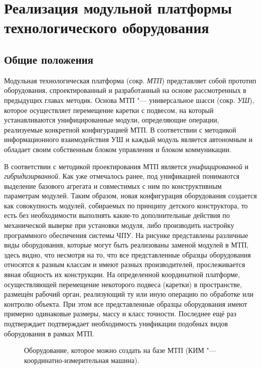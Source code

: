 \chapter{Реализация модульной платформы технологического оборудования}\label{ch:ch4}

\section{Общие положения}

Модульная технологическая платформа (сокр. \textit{МТП}) представляет собой прототип оборудования, спроектированный и разработанный на основе рассмотренных в предыдущих главах методик. Основа МТП "--- универсальное шасси (сокр. \textit{УШ}), которое осуществляет перемещение каретки с подвесом, на который устанавливаются унифицированные модули, определяющие операции, реализуемые конкретной конфигурацией МТП. В соответствии с  методикой информационного взаимодействия УШ и каждый модуль является автономным и обладает своим собственным блоком управления и блоком коммуникации.

В соответствии с методикой проектирования МТП является \textit{унифицированной} и \textit{гибридизирванной}. Как уже отмечалось ранее, под унификацией понимаются выделение базового агрегата и совместимых с ним по конструктивным параметрам модулей. Таким образом, новая конфигурация оборудования создается как совокупность модулей, собираемых по принципу детского конструктора, то есть без необходимости выполнять какие-то дополнительные действия по механической выверке при установки модуля, либо производить настройку программного обеспечения системы ЧПУ. На рисунке представлены различные виды оборудования, которые могут быть реализованы заменой модулей в МТП, здесь видно, что несмотря на то, что все представленные образцы оборудования относятся к разным классам и имеют разных производителей, прослеживается явная общность их конструкции. На определенной координатной платформе, осуществляющей перемещение некоторого подвеса (каретки) в пространстве, размещён рабочий орган, реализующий ту или иную операцию по обработке или контролю объекта. При этом все представленные образцы оборудования имеют примерно одинаковые размеры, массу и класс точности. Последнее ещё раз подтверждает подтверждает необходимость унификации подобных видов оборудования в рамках МТП.

\begin{figure}[ht]
	\caption{Оборудование, которое можно создать на базе МТП (КИМ "--- координатно-измерительная машина).}\label{fig:equip-types}
\end{figure}

